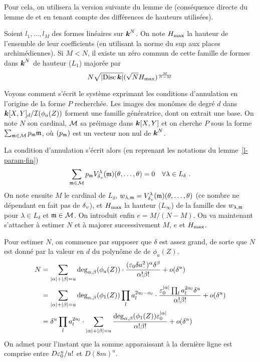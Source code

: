Pour cela, on utilisera la version suivante du lemme de 
(conséquence directe du lemme de  et  en tenant compte
des différences de hauteurs utilisées).

\begin{fait}
  Soient $l_1, \ldots, l_M$ des formes linéaires sur $\boldsymbol{k}^N$. On note $H_{\mathrm{max}}$
  la hauteur de l'ensemble de leur coefficients (en utilisant la norme du sup
  aux places archimédiennes). Si $M < N$, il existe un zéro commun de cette
  famille de formes dans $\boldsymbol{k}^N$ de hauteur ($L_1$) majorée par
  \[
    N \sqrt{\left\lvert\operatorname{Disc}\boldsymbol{k}\right\rvert} ( \sqrt N H_{\mathrm{max}} )^\frac M{N-M}
  \]
\end{fait}

Voyons comment s'écrit le système exprimant les conditions d'annulation en
l'origine de la forme $P$ recherchée. Les images des monômes de degré $d$ dans
$\boldsymbol{k}[X, Y]_d / \mathcal I(\phi_a(Z))$ forment une famille génératrice, dont on
extrait une base.  On note $N$ son cardinal, ${\mathcal M}$ sa préimage dans $\boldsymbol{k}[X,
Y]$ et on cherche $P$ sous la forme $\sum_{{\mathfrak m}\in{\mathcal M}} p_{\mathfrak m} {\mathfrak m}$,
où  $(p_{\mathfrak m})$ est un vecteur non nul de $\boldsymbol{k}^N$.

La condition d'annulation s'écrit alors (en reprenant les notations du
lemme~\ref{l-param-fin})
\[
  \sum_{{\mathfrak m}\in{\mathcal M}}
  p_{\mathfrak m} V_{\delta\smash{_v}}^\lambda({\mathfrak m})(\theta, \ldots, \theta)
  = 0 \quad
  \forall \lambda\in L_\delta \text{ .}
\]
On note ensuite $M$ le cardinal de $L_\delta$, $w_{\lambda, {\mathfrak m}} =
V_{\delta\smash{_v}}^\lambda({\mathfrak m})(\theta, \ldots, \theta)$ (ce nombre ne dépendant en fait pas
de ${\delta\smash{_v}}$), et $H_{\mathrm{max}}$ la hauteur ($L_\infty$) de la famille des $w_{\lambda,
  {\mathfrak m}}$ pour $\lambda \in L_\delta$ et ${\mathfrak m} \in {\mathcal M}$. On introduit
enfin $e = M/(N-M)$. On va maintenant s'attacher à estimer $N$ et à majorer
successivement $M$, $e$ et $H_{\mathrm{max}}$.

Pour estimer $N$, on commence par supposer que $\delta$ est assez grand, de
sorte que $N$ est donné par la valeur en $d$ du polynôme de  de
$\phi_a(Z)$.
\begin{align*}
  N
  & = \sum_{\lgr\alpha + \lgr\beta = u}
    \deg_{\alpha, \beta}(\phi_a(Z))
    \cdot \frac{
      (\eps_0 \delta a_\truc^2)^\alpha \delta^\beta}{%
      \alpha! \beta!}
    + o(\delta^u) \\
  & = \sum_{\lgr\alpha + \lgr\beta = u}
    \deg_{\alpha, \beta}(\phi_1(Z)) \prod_l a_l^{2u_l - \alpha_l}
    \cdot \frac{
      \eps_0^{\lgr\alpha} \prod_l a_l^{2\alpha_l} \delta^u}{%
      \alpha! \beta!}
    + o(\delta^u) \\
  & = \delta^u \prod_l a_l^{2u_l} \cdot
    \sum_{\lgr\alpha + \lgr\beta = u}
    \frac{
      \deg_{\alpha, \beta} (\phi_1(Z)) \eps_0^{\lgr\alpha}}{
      \alpha! \beta!}
    + o(\delta^u)
\end{align*}
On admet pour l'instant que la somme apparaissant à la dernière ligne est
comprise entre $D \varepsilon_0^u / u!$ et $D (8m)^u$.

